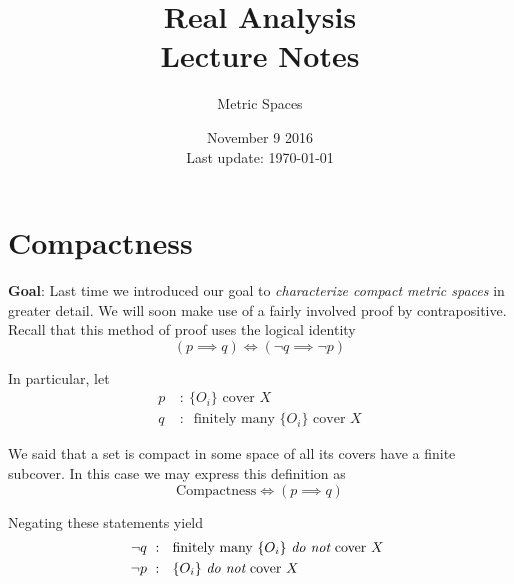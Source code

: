 \documentclass[12pt]{article}
\newlength\tindent
\renewcommand{\indent}{\hspace*{\tindent}}
\begin{document}
 
 
\title{Real Analysis\\Lecture Notes}
\author{Metric Spaces}
\date{November 9 2016 \\ Last update: \today{}}
\maketitle

\section{Compactness}

%
%
{\bf Goal}: Last time we introduced our goal to {\em characterize compact metric spaces} in greater detail. We will soon make use of a fairly involved proof by contrapositive. Recall that this method of proof uses the logical identity
\begin{equation*}
	\left( p \implies q \right) \iff \left( \neg q \implies \neg p \right)
\end{equation*}

In particular, let
\begin{align*}
	p ~&:~ \{O_i\} \text{ cover $X$} \\
	q ~&:~ \text{ finitely many $\{O_i\}$ cover $X$}
\end{align*}

\indent We said that a set is compact in some space of all its covers have a finite subcover. In this case we may express this definition as
\begin{equation*}
	\text{Compactness} \iff \left( p \implies q \right)
\end{equation*}

Negating these statements yield 
\begin{align*}
	\neg q ~&:~ \text{ finitely many $\{O_i\}$ {\em do not} cover $X$ } \\
	\neg p ~&:~ \text{ $\{O_i\}$ {\em do not} cover $X$ }
\end{align*}
\end{document}
